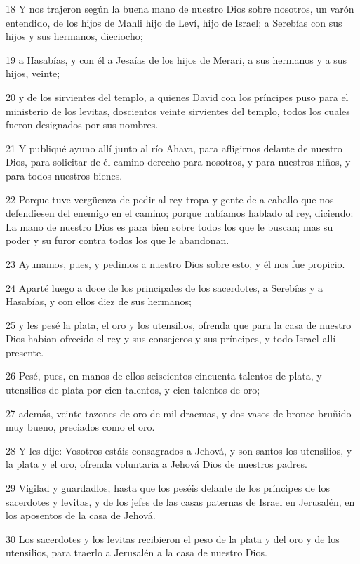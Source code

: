 \par 18 Y nos trajeron según la buena mano de nuestro Dios sobre nosotros, un varón entendido, de los hijos de Mahli hijo de Leví, hijo de Israel; a Serebías con sus hijos y sus hermanos, dieciocho;
\par 19 a Hasabías, y con él a Jesaías de los hijos de Merari, a sus hermanos y a sus hijos, veinte;
\par 20 y de los sirvientes del templo, a quienes David con los príncipes puso para el ministerio de los levitas, doscientos veinte sirvientes del templo, todos los cuales fueron designados por sus nombres.
\par 21 Y publiqué ayuno allí junto al río Ahava, para afligirnos delante de nuestro Dios, para solicitar de él camino derecho para nosotros, y para nuestros niños, y para todos nuestros bienes.
\par 22 Porque tuve vergüenza de pedir al rey tropa y gente de a caballo que nos defendiesen del enemigo en el camino; porque habíamos hablado al rey, diciendo: La mano de nuestro Dios es para bien sobre todos los que le buscan; mas su poder y su furor contra todos los que le abandonan.
\par 23 Ayunamos, pues, y pedimos a nuestro Dios sobre esto, y él nos fue propicio.
\par 24 Aparté luego a doce de los principales de los sacerdotes, a Serebías y a Hasabías, y con ellos diez de sus hermanos;
\par 25 y les pesé la plata, el oro y los utensilios, ofrenda que para la casa de nuestro Dios habían ofrecido el rey y sus consejeros y sus príncipes, y todo Israel allí presente. 
\par 26 Pesé, pues, en manos de ellos seiscientos cincuenta talentos de plata,  y utensilios de plata por cien talentos, y cien talentos de oro;
\par 27 además, veinte tazones de oro de mil dracmas, y dos vasos de bronce bruñido muy bueno, preciados como el oro.
\par 28 Y les dije: Vosotros estáis consagrados a Jehová, y son santos los utensilios, y la plata y el oro, ofrenda voluntaria a Jehová Dios de nuestros padres.
\par 29 Vigilad y guardadlos, hasta que los peséis delante de los príncipes de los sacerdotes y levitas, y de los jefes de las casas paternas de Israel en Jerusalén, en los aposentos de la casa de Jehová.
\par 30 Los sacerdotes y los levitas recibieron el peso de la plata y del oro y de los utensilios, para traerlo a Jerusalén a la casa de nuestro Dios.
